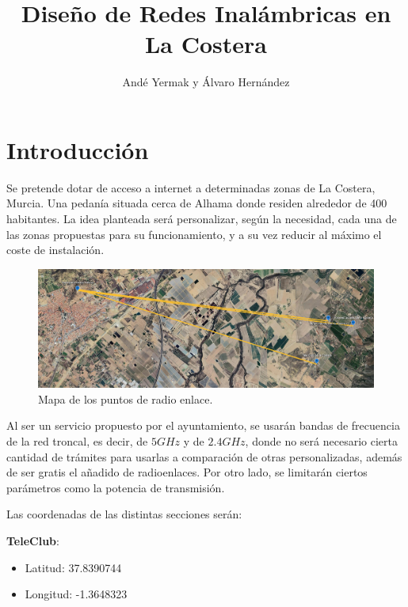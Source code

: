 \documentclass{article}
\title{Diseño de Redes Inalámbricas en La Costera}
\author{Andé Yermak y Álvaro Hernández}
\begin{document}
\maketitle

\tableofcontents
\newpage

\section{Introducción}

Se pretende dotar de acceso a internet a determinadas zonas de La Costera, Murcia. Una pedanía situada cerca de Alhama donde residen alrededor de 400 habitantes. La idea planteada será personalizar, según la necesidad, cada una de las zonas propuestas para su funcionamiento, y a su vez reducir al máximo el coste de instalación.

\begin{figure}[ht]
    \centering
    \includegraphics[width=0.8
    \linewidth]{src/earthpoints.png}
    \caption{\label{fig:earthpoints} Mapa de los puntos de radio enlace.}
\end{figure}

\quad

Al ser un servicio propuesto por el ayuntamiento, se usarán bandas de frecuencia de la red troncal, es decir, de $5GHz$ y de $2.4GHz$, donde no será necesario cierta cantidad de trámites para usarlas a comparación de otras personalizadas, además de ser gratis el añadido de radioenlaces. Por otro lado, se limitarán ciertos parámetros como la potencia de transmisión.

\quad

Las coordenadas de las distintas secciones serán:

\quad

\textbf{TeleClub}:
\begin{itemize}

    \item Latitud: 37.8390744
    \item Longitud: -1.3648323

\end{itemize}
\end{document}
